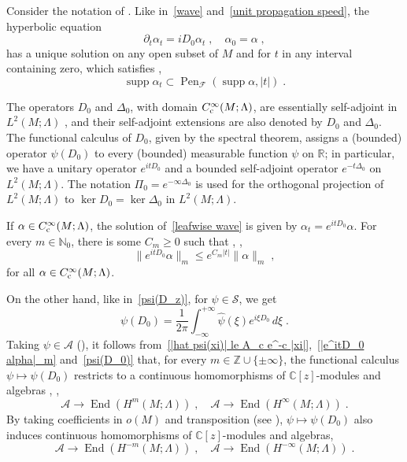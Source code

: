\documentclass{memo-l}
\theoremstyle{plain}
\theoremstyle{definition}
\theoremstyle{remark}
\newcommand{\C}{\mathbb{C}}
\newcommand{\N}{\mathbb{N}}
\newcommand{\R}{\mathbb{R}}
\newcommand{\Z}{\mathbb{Z}}
\renewcommand{\AA}{\mathcal{A}}
\newcommand{\FF}{\mathcal{F}}
\renewcommand{\SS}{\mathcal{S}}
\newcommand{\supp}{\operatorname{supp}}
\newcommand{\End}{\operatorname{End}}
\newcommand{\Pen}{\operatorname{Pen}}
\newcommand{\Cinftyc}{C^\infty_{\text{\rm c}}}
\numberwithin{section}{chapter}
\numberwithin{equation}{section}%
\begin{document}
Consider the notation of . Like in~\eqref{wave} and~\eqref{unit propagation speed}, the hyperbolic equation
\begin{equation}\label{leafwise wave}
\partial_t\alpha_t=iD_0\alpha_t\;,\quad\alpha_0=\alpha\;,
\end{equation}
has a unique solution on any open subset of $M$ and for $t$ in any interval containing zero, which satisfies \cite[Theorem~1.3]{Chernoff1973}, \cite[Proposition~1.2]{Roe1987}
\begin{equation}\label{leafwise unit propagation speed}
\supp\alpha_t\subset\Pen_\FF(\supp\alpha,|t|)\;.
\end{equation}

The operators $D_0$ and $\Delta_0$, with domain $\Cinftyc(M;\Lambda)$, are essentially self-adjoint in $L^2(M;\Lambda)$ \cite[Theorem~2.2]{Chernoff1973}, and their self-adjoint extensions are also denoted by $D_0$ and $\Delta_0$. The functional calculus of $D_0$, given by the spectral theorem, assigns a (bounded) operator $\psi(D_0)$ to every (bounded) measurable function $\psi$ on $\R$; in particular, we have a unitary operator $e^{itD_0}$ and a bounded self-adjoint operator $e^{-t\Delta_0}$ on $L^2(M;\Lambda)$. The notation $\Pi_0=e^{-\infty\Delta_0}$ is used for the orthogonal projection of $L^2(M;\Lambda)$ to $\ker D_0=\ker\Delta_0$ in $L^2(M;\Lambda)$.

If $\alpha\in\Cinftyc(M;\Lambda)$, the solution of~\eqref{leafwise wave} is given by $\alpha_t=e^{itD_0}\alpha$. For every $m\in\N_0$, there is some $C_m\ge0$ such that \cite[Section~IV.2]{Taylor1981}, \cite[Proposition~1.4]{Roe1987}, \cite[Proposition~7.1]{AlvKordyLeichtnam2020}
\begin{equation}\label{|e^itD_0 alpha|_m}
\|e^{itD_0}\alpha\|_m\le e^{C_m|t|}\|\alpha\|_m\;,
\end{equation}
for all $\alpha\in\Cinftyc(M;\Lambda)$.

On the other hand, like in~\eqref{psi(D_z)}, for $\psi\in\SS$, we get
\begin{equation}\label{psi(D_0)}
\psi(D_0)=\frac{1}{2\pi}\int_{-\infty}^{+\infty}\hat\psi(\xi)e^{i\xi D_0}\,d\xi\;.
\end{equation}
Taking $\psi\in\AA$ (), it follows from~\eqref{|hat psi(xi)| le A_c e^-c |xi|},~\eqref{|e^itD_0 alpha|_m} and~\eqref{psi(D_0)} that, for every $m\in\Z\cup\{\pm\infty\}$, the functional calculus $\psi\mapsto\psi(D_0)$ restricts to a continuous homomorphisms of $\C[z]$-modules and algebras \cite[Proposition~4.1]{Roe1987}, \cite[Proposition~7.2]{AlvKordyLeichtnam2020},
\begin{equation}\label{functional calculus}
\AA\to\End(H^m(M;\Lambda))\;,\quad\AA\to\End(H^\infty(M;\Lambda))\;.
\end{equation}
By taking coefficients in $o(M)$ and transposition (see ), $\psi\mapsto\psi(D_0)$ also induces continuous homomorphisms of $\C[z]$-modules and algebras,
\begin{equation}\label{functional calculus on currents}
\AA\to\End(H^{-m}(M;\Lambda))\;,\quad\AA\to\End(H^{-\infty}(M;\Lambda))\;.
\end{equation}
\end{document}
